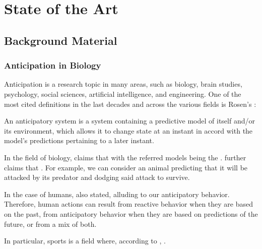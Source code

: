 \chapter{State of the Art}
\label{chapter:state_of_the_art}

\section{Background Material}

\subsection{Anticipation in Biology}

Anticipation is a research topic in many areas, such as biology, brain studies, psychology, social sciences, artificial intelligence, and engineering. One of the most cited definitions in the last decades and across the various fields is Rosen's \cite{Rosen1985}:

\begin{displayquote}
An anticipatory system is a system containing a predictive model of itself and/or its environment, which allows it to change state at an instant in accord with the model's predictions pertaining to a later instant.
\end{displayquote}

In the field of biology, \textcite{Louie2010} claims that  with the referred models being the . \textcite{Poli2010} further claims that . For example, we can consider an animal predicting that it will be attacked by its predator and dodging said attack to survive.

In the case of humans, \textcite{Louie2010} also stated,  alluding to our anticipatory behavior. Therefore, human actions can result from reactive behavior when they are based on the past, from anticipatory behavior when they are based on predictions of the future, or from a mix of both.

In particular, sports is a field where, according to \textcite{Smith2016}, .

